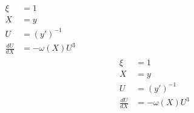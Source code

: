 \documentclass{article}
\begin{document}
$\begin{aligned}
\xi &= 1\\
X &= y\\
U &= (y')^{-1}\\
\frac{dU}{dX} &= -\omega(X) U^3
\end{aligned}$
\begin{gather*}
\begin{aligned}
\xi &= 1\\
X &= y\\
U &= (y')^{-1}\\
\frac{dU}{dX} &= -\omega(X) U^3
\end{aligned}
\end{gather*}
\end{document}
